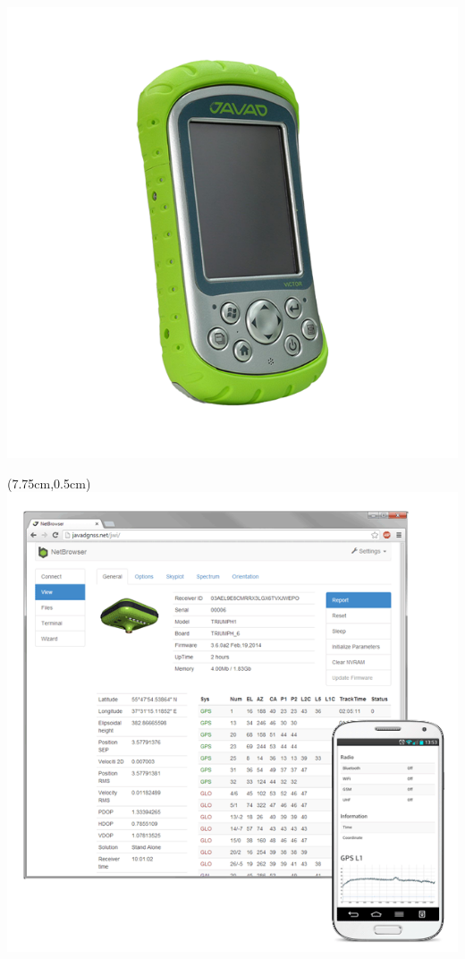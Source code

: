 \documentclass[xetex,с,aspectratio=169]{beamer}
\begin{document}
\begin{frame}
\begin{textblock*}{3cm}
    \includegraphics[width=\textwidth]{../img/javad-victor}
  \end{textblock*}
  \begin{textblock*}{3.5cm}(7.75cm,0.5cm)
    \includegraphics[width=\textwidth]{../img/javad-netbrowser}

\end{textblock*}
\end{frame}
\end{document}
